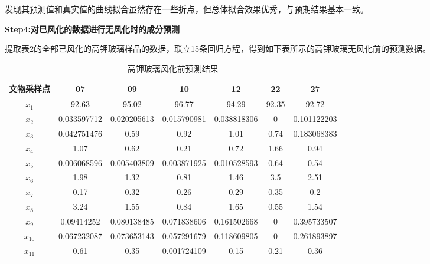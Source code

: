 \documentclass[UTF8]{ctexart}
\begin{document}
                发现其预测值和真实值的曲线拟合虽然存在一些折点，但总体拟合效果优秀，与预期结果基本一致。

                \textbf{Step4:对已风化的数据进行无风化时的成分预测}

                提取表2的全部已风化的高钾玻璃样品的数据，联立15条回归方程，得到如下表所示的高钾玻璃无风化前的预测数据。
                \begin{table}[H]
                    \centering
                    \caption{高钾玻璃风化前预测结果}
                    \begin{tabular}{|c|c|c|c|c|c|c|}
                        \hline
                        文物采样点 & 07          & 09          & 10          & 12          & 22    & 27          \\ \hline
                        $x_1$      & 92.63       & 95.02       & 96.77       & 94.29       & 92.35 & 92.72       \\ \hline
                        $x_2$      & 0.033597712 & 0.020205613 & 0.015790981 & 0.038818306 & 0     & 0.101122203 \\ \hline
                        $x_3$      & 0.042751476 & 0.59        & 0.92        & 1.01        & 0.74  & 0.183068383 \\ \hline
                        $x_4$      & 1.07        & 0.62        & 0.21        & 0.72        & 1.66  & 0.94        \\ \hline
                        $x_5$      & 0.006068596 & 0.005403809 & 0.003871925 & 0.010528593 & 0.64  & 0.54        \\ \hline
                        $x_6$      & 1.98        & 1.32        & 0.81        & 1.46        & 3.5   & 2.51        \\ \hline
                        $x_7$      & 0.17        & 0.32        & 0.26        & 0.29        & 0.35  & 0.2         \\ \hline
                        $x_8$      & 3.24        & 1.55        & 0.84        & 1.65        & 0.55  & 1.54        \\ \hline
                        $x_9$      & 0.09414252  & 0.080138485 & 0.071838606 & 0.161502668 & 0     & 0.395733507 \\ \hline
                        $x_{10}$   & 0.067232087 & 0.073653143 & 0.057291679 & 0.118609805 & 0     & 0.261893897 \\ \hline
                        $x_{11}$   & 0.61        & 0.35        & 0.001724109 & 0.15        & 0.21  & 0.36        \\ \hline

\end{tabular}
\end{table}
\end{document}
